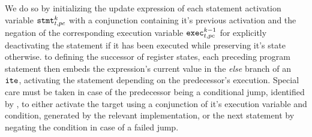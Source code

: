 We do so by initializing the update expression of each statement activation variable $\texttt{stmt}^k_{t, pc}$ with a conjunction containing it's previous activation and the negation of the corresponding execution variable $\texttt{exec}^{k - 1}_{t, pc}$ for explicitly deactivating the statement if it has been executed while preserving it's state otherwise.
 to defining the successor of register states, each preceding program statement then embeds the expression's current value in the \emph{else} branch of an $\texttt{ite}$, activating the statement depending on the predecessor's execution.
Special care must be taken in case of the predecessor being a conditional jump, identified by , to either activate the target using a conjunction of it's execution variable and condition, generated by the relevant  implementation, or the next statement by negating the condition in case of a failed jump.


